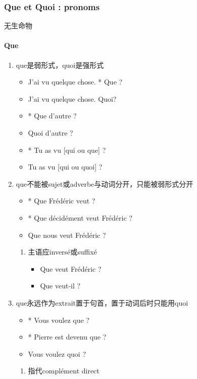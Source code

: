 \documentclass[UTF8]{report}
\begin{document}
\subsubsection{Que et Quoi : pronoms}
无生命物
\paragraph{Que}
\begin{enumerate}
    \item que是弱形式，quoi是强形式
    \begin{itemize}
        \item J’ai vu quelque chose. * Que ?
        \item J’ai vu quelque chose. Quoi?
        \item * Que d’autre ?
        \item Quoi d’autre ?
        \item * Tu as vu [qui ou que] ?
        \item Tu as vu [qui ou quoi] ?
    \end{itemize}
    \item que不能被sujet或adverbe与动词分开，只能被弱形式分开
    \begin{itemize}
        \item * Que Frédéric veut ?
        \item * Que décidément veut Frédéric ?
        \item Que nous veut Frédéric ?
    \end{itemize}
    \begin{enumerate}
        \item 主语应inversé或suffixé
        \begin{itemize}
            \item Que veut Frédéric ?
            \item Que veut-il ?
        \end{itemize}
    \end{enumerate}
    \item que永远作为extrait置于句首，置于动词后时只能用quoi
    \begin{itemize}
        \item * Vous voulez que ?
        \item * Pierre est devenu que ?
        \item Vous voulez quoi ?
    \end{itemize}
    \begin{enumerate}
        \item 指代complément direct

\end{enumerate}
\end{enumerate}
\end{document}
